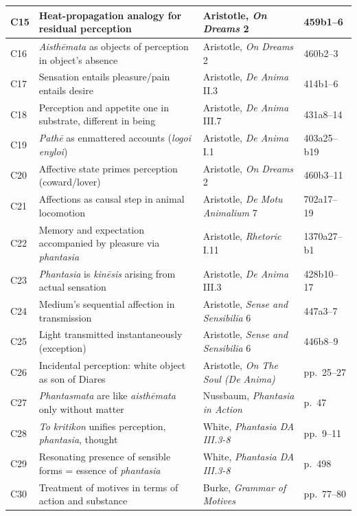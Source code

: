 \documentclass[12pt]{article}
\begin{document}
\begin{center}
\begin{tabular}{|l|l|l|l|}
\hline
C15 & Heat-propagation analogy for residual perception & Aristotle, \textit{On Dreams} 2 & 459b1--6 \\
\hline
C16 & \textit{Aisthēmata} as objects of perception in object's absence & Aristotle, \textit{On Dreams} 2 & 460b2--3 \\
\hline
C17 & Sensation entails pleasure/pain entails desire & Aristotle, \textit{De Anima} II.3 & 414b1--6 \\
\hline
C18 & Perception and appetite one in substrate, different in being & Aristotle, \textit{De Anima} III.7 & 431a8--14 \\
\hline
C19 & \textit{Pathē} as enmattered accounts (\textit{logoi enyloi}) & Aristotle, \textit{De Anima} I.1 & 403a25--b19 \\
\hline
C20 & Affective state primes perception (coward/lover) & Aristotle, \textit{On Dreams} 2 & 460b3--11 \\
\hline
C21 & Affections as causal step in animal locomotion & Aristotle, \textit{De Motu Animalium} 7 & 702a17--19 \\
\hline
C22 & Memory and expectation accompanied by pleasure via \textit{phantasia} & Aristotle, \textit{Rhetoric} I.11 & 1370a27--b1 \\
\hline
C23 & \textit{Phantasia} is \textit{kinēsis} arising from actual sensation & Aristotle, \textit{De Anima} III.3 & 428b10--17 \\
\hline
C24 & Medium's sequential affection in transmission & Aristotle, \textit{Sense and Sensibilia} 6 & 447a3--7 \\
\hline
C25 & Light transmitted instantaneously (exception) & Aristotle, \textit{Sense and Sensibilia} 6 & 446b8--9 \\
\hline
C26 & Incidental perception: white object as son of Diares & Aristotle, \textit{On The Soul (De Anima)} & pp.~25--27 \\
\hline
C27 & \textit{Phantasmata} are like \textit{aisthēmata} only without matter & Nussbaum, \textit{Phantasia in Action} & p.~47 \\
\hline
C28 & \textit{To kritikon} unifies perception, \textit{phantasia}, thought & White, \textit{Phantasia DA III.3-8} & pp.~9--11 \\
\hline
C29 & Resonating presence of sensible forms = essence of \textit{phantasia} & White, \textit{Phantasia DA III.3-8} & p.~498 \\
\hline
C30 & Treatment of motives in terms of action and substance & Burke, \textit{Grammar of Motives} & pp.~77--80 \\

\end{tabular}
\end{center}
\end{document}
